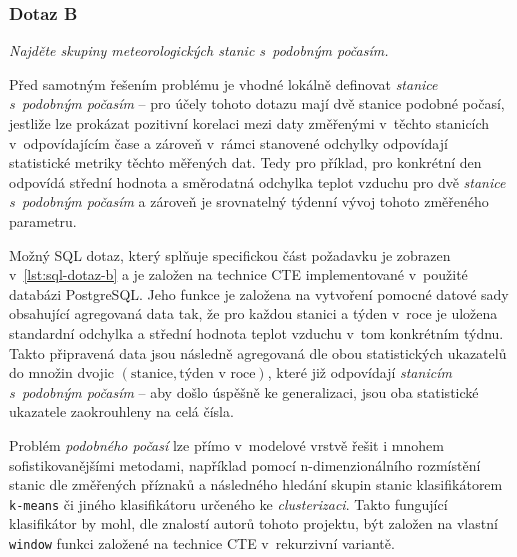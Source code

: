 \documentclass[10pt,a4paper,titlepage]{extarticle}
\begin{document}
    \subsubsection{Dotaz B}
    \emph{Najděte skupiny meteorologických stanic s~podobným počasím.}

    Před samotným řešením problému je vhodné lokálně definovat \emph{stanice s~podobným počasím} -- pro účely tohoto
    dotazu mají dvě stanice podobné počasí, jestliže lze prokázat pozitivní korelaci mezi daty změřenými v~těchto
    stanicích v~odpovídajícím čase a zároveň v~rámci stanovené odchylky odpovídají statistické metriky těchto
    měřených dat. Tedy pro příklad, pro konkrétní den odpovídá střední hodnota a směrodatná odchylka teplot vzduchu
    pro dvě \emph{stanice s~podobným počasím} a zároveň je srovnatelný týdenní vývoj tohoto změřeného parametru.

    Možný SQL dotaz, který splňuje specifickou část požadavku je zobrazen v~\ref{lst:sql-dotaz-b} a je založen na
    technice CTE implementované v~použité databázi PostgreSQL. Jeho funkce je založena na vytvoření pomocné datové
    sady obsahující agregovaná data tak, že pro každou stanici a týden v~roce je uložena standardní odchylka a
    střední hodnota teplot vzduchu v~tom konkrétním týdnu. Takto připravená data jsou následně agregovaná dle obou
    statistických ukazatelů do množin dvojic $(\text{stanice}, \text{týden v roce})$, které již odpovídají
    \emph{stanicím s~podobným počasím} -- aby došlo úspěšně ke generalizaci, jsou oba statistické ukazatele
    zaokrouhleny na celá čísla.

    Problém \emph{podobného počasí} lze přímo v~modelové vrstvě řešit i mnohem sofistikovanějšími
    metodami, například pomocí n-dimenzionálního rozmístění stanic dle změřených příznaků a následného hledání 
    skupin stanic klasifikátorem \texttt{k-means} či jiného klasifikátoru určeného ke \emph{clusterizaci}. Takto
    fungující klasifikátor by mohl, dle znalostí autorů tohoto projektu, být založen na vlastní \texttt{window}
    funkci založené na technice CTE v~rekurzivní variantě.
\end{document}
